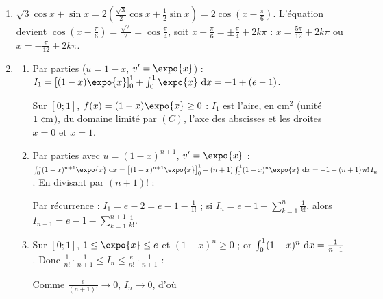\begin{description}
\begin{enumerate}
			Ainsi $\varphi(x) = -x^2 + x + k$, $k \in \mathbb{R}$, et $g(x) = \expo{x}\varphi(x) = (-x^2 + x + k)\expo{x}$
			(réciproquement ces fonctions sont solutions, le calcul précédent étant réversible). $g(0) = k = 1$ :
			\par\noindent{}
		\item {}
			$\sqrt{3}\cos x + \sin x = 2\left(\frac{\sqrt{3}}{2}\cos x + \frac{1}{2}\sin x\right) = 2\cos\left(x - \frac{\pi}{6}\right)$.
			L'équation devient $\cos\left(x - \frac{\pi}{6}\right) = \frac{\sqrt{2}}{2} = \cos\frac{\pi}{4}$, soit $x - \frac{\pi}{6} = \pm\frac{\pi}{4} + 2k\pi$ :
			$x = \frac{5\pi}{12} + 2k\pi$ ou $x = -\frac{\pi}{12} + 2k\pi$.
			\par\noindent{}
		\item
		\begin{enumerate}
			\item {}
				Par parties ($u = 1 - x$, $v' = \expo{x}$) : $I_1 = \left[(1-x)\expo{x}\right]_0^1 + \int_0^1 \expo{x}\dx = -1 + (e - 1)$.
				\par\noindent{}
				Sur $[0;1]$, $f(x) = (1 - x)\expo{x} \geq 0$ : $I_1$ est l'aire, en $\mathrm{cm}^2$ (unité $1~\mathrm{cm}$), du domaine limité par $(C)$, l'axe des abscisses et les droites $x = 0$ et $x = 1$.
			\item {}
				Par parties avec $u = (1 - x)^{n+1}$, $v' = \expo{x}$ :
				$\int_0^1 (1-x)^{n+1}\expo{x}\dx = \left[(1-x)^{n+1}\expo{x}\right]_0^1 + (n+1)\int_0^1 (1-x)^n\expo{x}\dx = -1 + (n+1)\,n!\,I_n$.
				En divisant par $(n+1)!$ : \par\noindent{}
				Par récurrence : $I_1 = e - 2 = e - 1 - \frac{1}{1!}$ ; si $I_n = e - 1 - \sum_{k=1}^{n}\frac{1}{k!}$, alors $I_{n+1} = e - 1 - \sum_{k=1}^{n+1}\frac{1}{k!}$.
				\par\noindent{}
			\item {}
				Sur $[0;1]$, $1 \leq \expo{x} \leq e$ et $(1 - x)^n \geq 0$ ; or $\int_0^1 (1-x)^n~\mathrm{d}x = \frac{1}{n+1}$. Donc
				$\frac{1}{n!}\cdot\frac{1}{n+1} \leq I_n \leq \frac{e}{n!}\cdot\frac{1}{n+1}$ :
				\par\noindent{}
				Comme $\frac{e}{(n+1)!} \to 0$, $I_n \to 0$, d'où
				\par\noindent{}
		\end{enumerate}
	\end{enumerate}
\end{description}
